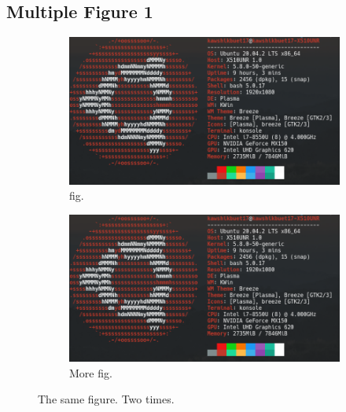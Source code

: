 \documentclass[14pt, a4paper]{article} %
\begin{document}
    \subsection{Multiple Figure 1}
        \begin{figure}[h!]
            \centering
            \begin{subfigure}[b]{0.4\linewidth}
                \includegraphics[width=\linewidth]{figure1.jpg}
                \caption{fig.}
            \end{subfigure}
            \begin{subfigure}[b]{0.4\linewidth}
                \includegraphics[width=\linewidth]{figure1.jpg}
                \caption{More fig.}
            \end{subfigure}
            \caption{The same figure. Two times.}
        \end{figure}
        
\end{document}
